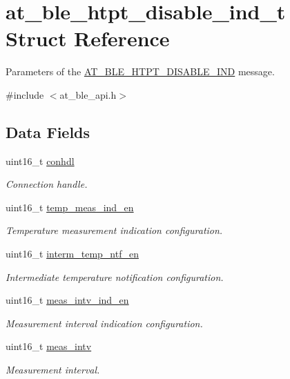 \hypertarget{structat__ble__htpt__disable__ind__t}{}\section{at\+\_\+ble\+\_\+htpt\+\_\+disable\+\_\+ind\+\_\+t Struct Reference}
\label{structat__ble__htpt__disable__ind__t}


Parameters of the \mbox{\hyperlink{at__ble__api_8h_a3324640b95f33169515f89738ed5baeba4de7b73513055a5e7e988a928b93730d}{A\+T\+\_\+\+B\+L\+E\+\_\+\+H\+T\+P\+T\+\_\+\+D\+I\+S\+A\+B\+L\+E\+\_\+\+I\+ND}} message.  




{\ttfamily \#include $<$at\+\_\+ble\+\_\+api.\+h$>$}

\subsection*{Data Fields}
\begin{DoxyCompactItemize}
\item 
uint16\+\_\+t \mbox{\hyperlink{structat__ble__htpt__disable__ind__t_a0e06225279ecca6fb6e57fe77c344f27}{conhdl}}
\begin{DoxyCompactList}\small\item\em Connection handle. \end{DoxyCompactList}\item 
uint16\+\_\+t \mbox{\hyperlink{structat__ble__htpt__disable__ind__t_aff30ce6defa6c926c2c960d839c49096}{temp\+\_\+meas\+\_\+ind\+\_\+en}}
\begin{DoxyCompactList}\small\item\em Temperature measurement indication configuration. \end{DoxyCompactList}\item 
uint16\+\_\+t \mbox{\hyperlink{structat__ble__htpt__disable__ind__t_aa9ff61f710c05120a6ff2a8b957b441a}{interm\+\_\+temp\+\_\+ntf\+\_\+en}}
\begin{DoxyCompactList}\small\item\em Intermediate temperature notification configuration. \end{DoxyCompactList}\item 
uint16\+\_\+t \mbox{\hyperlink{structat__ble__htpt__disable__ind__t_a20cab139a2b25a895fd964bda74eecc4}{meas\+\_\+intv\+\_\+ind\+\_\+en}}
\begin{DoxyCompactList}\small\item\em Measurement interval indication configuration. \end{DoxyCompactList}\item 
uint16\+\_\+t \mbox{\hyperlink{structat__ble__htpt__disable__ind__t_aeb599955ad46d909818ed82e07c45181}{meas\+\_\+intv}}
\begin{DoxyCompactList}\small\item\em Measurement interval. \end{DoxyCompactList}\end{DoxyCompactItemize}


